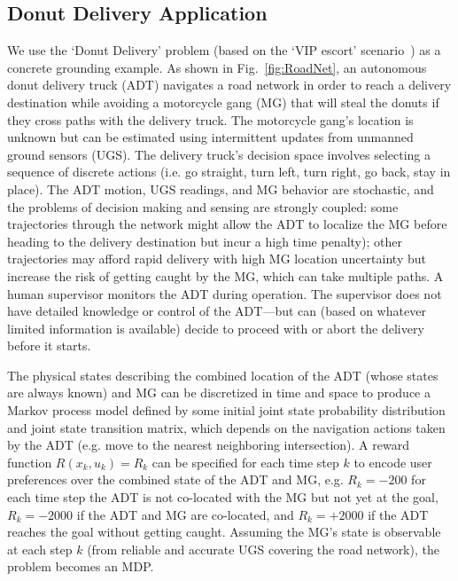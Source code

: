 \subsection{Donut Delivery Application} \label{sec:donut_delivery}
We use the `Donut Delivery' problem (based on the `VIP escort' scenario~\cite{Humphrey2012-lr}) as a concrete grounding example. As shown in Fig.~\ref{fig:RoadNet}, an autonomous donut delivery truck (ADT) navigates a road network in order to reach a delivery destination while avoiding a motorcycle gang (MG) that will steal the donuts if they cross paths with the delivery truck. The motorcycle gang's location is unknown but can be estimated using intermittent updates from unmanned ground sensors (UGS). The delivery truck's decision space involves selecting a sequence of discrete actions (i.e. go straight, turn left, turn right, go back, stay in place). The ADT motion, UGS readings, and MG behavior are stochastic, and the problems of decision making and sensing are strongly coupled: some trajectories through the network might allow the ADT to localize the MG before heading to the delivery destination but incur a high time penalty); other trajectories may afford rapid delivery with high MG location uncertainty but increase the risk of getting caught by the MG, which can take multiple paths. A human supervisor monitors the ADT during operation. The supervisor does not have detailed knowledge or control of the ADT---but can  (based on whatever limited information is available) decide to proceed with or abort the delivery before it starts. 

The physical states describing the combined location of the ADT (whose states are always known) and MG can be discretized in time and space to produce a Markov process model defined by some initial joint state probability distribution and joint state transition matrix, which depends on the navigation actions taken by the ADT (e.g. move to the nearest neighboring intersection).
A reward function $R(x_k,u_k) = R_k$ can be specified for each time step $k$ to encode user preferences over the combined state of the ADT and MG, e.g. $R_k = -200$ for each time step the ADT is not co-located with the MG but not yet at the goal, $R_k= -2000$ if the ADT and MG are co-located, and $R_k=+2000$ if the ADT reaches the goal without getting caught. 
Assuming the MG's state is observable at each step $k$ (from reliable and accurate UGS covering the road network), the problem becomes an MDP. 


